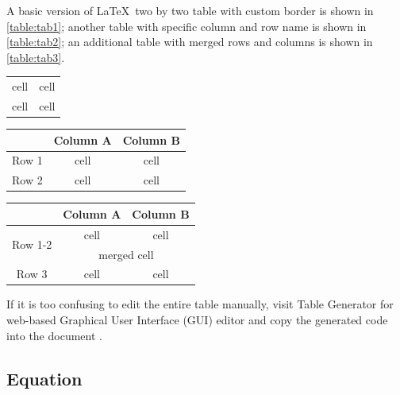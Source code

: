 A basic version of \LaTeX\ two by two table with custom border is shown in \autoref{table:tab1}; another table with specific column and row name is shown in \autoref{table:tab2}; an additional table with merged rows and columns is shown in \autoref{table:tab3}.

\begin{center}
    \label{table:tab1}
    \begin{tabular}{ c | c }
        \hline
        cell & cell \\
        cell & cell \\
        \hline
    \end{tabular}
\end{center}


\begin{center}
    \label{table:tab2}
    \begin{tabular}{ c | c c }
        \toprule
         & Column A & Column B \\
        \midrule
        Row 1 & cell & cell \\
        Row 2 & cell & cell \\
        \bottomrule
    \end{tabular}
\end{center}

\begin{center}
    \label{table:tab3}
    \begin{tabular}{ c | c c }
        \toprule
         & Column A & Column B \\
        \midrule
        \multirow[t]{2}{*}{Row 1-2} & cell & cell \\
                                    & \multicolumn{2}{c}{merged cell} \\
        Row 3 & cell & cell \\
        \bottomrule
    \end{tabular}
\end{center}

If it is too confusing to edit the entire table manually, visit Table Generator for web-based Graphical User Interface (GUI) editor and copy the generated code into the document \cite{table_gen}.

\subsection{Equation}

